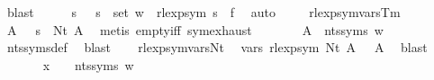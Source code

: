 \begin{isabellebody}
\ blast\isanewline
\ \ \isamarkupfalse%
\ \isamarkupfalse%
\ s\ \ {\isacharasterisk}{\kern0pt}{\isacharasterisk}{\kern0pt}{\isacharcolon}{\kern0pt}\ {\isachardoublequoteopen}s\ {\isasymin}\ set\ w\ {\isasymand}\ rlexp{\isacharunderscore}{\kern0pt}sym\ s\ {\isacharequal}{\kern0pt}\ f{\isachardoublequoteclose}\ \isamarkupfalse%
\ auto\isanewline
\ \ \isamarkupfalse%
\ {\isacharasterisk}{\kern0pt}\ rlexp{\isacharunderscore}{\kern0pt}sym{\isacharunderscore}{\kern0pt}vars{\isacharunderscore}{\kern0pt}Tm\ \isamarkupfalse%
\ A\ \ {\isacharasterisk}{\kern0pt}{\isacharasterisk}{\kern0pt}{\isacharasterisk}{\kern0pt}{\isacharcolon}{\kern0pt}\ {\isachardoublequoteopen}s\ {\isacharequal}{\kern0pt}\ Nt\ A{\isachardoublequoteclose}\ \isamarkupfalse%
\ {\isacharparenleft}{\kern0pt}metis\ empty{\isacharunderscore}{\kern0pt}iff\ sym{\isachardot}{\kern0pt}exhaust{\isacharparenright}{\kern0pt}\isanewline
\ \ \isamarkupfalse%
\ {\isacharasterisk}{\kern0pt}{\isacharasterisk}{\kern0pt}\ \isamarkupfalse%
\ {\isacharasterisk}{\kern0pt}{\isacharasterisk}{\kern0pt}{\isacharasterisk}{\kern0pt}{\isacharasterisk}{\kern0pt}{\isacharcolon}{\kern0pt}\ {\isachardoublequoteopen}A\ {\isasymin}\ nts{\isacharunderscore}{\kern0pt}syms\ w{\isachardoublequoteclose}\ \isamarkupfalse%
\ nts{\isacharunderscore}{\kern0pt}syms{\isacharunderscore}{\kern0pt}def\ \isamarkupfalse%
\ blast\isanewline
\ \ \isamarkupfalse%
\ rlexp{\isacharunderscore}{\kern0pt}sym{\isacharunderscore}{\kern0pt}vars{\isacharunderscore}{\kern0pt}Nt\ \isamarkupfalse%
\ {\isachardoublequoteopen}vars\ {\isacharparenleft}{\kern0pt}rlexp{\isacharunderscore}{\kern0pt}sym\ {\isacharparenleft}{\kern0pt}Nt\ A{\isacharparenright}{\kern0pt}{\isacharparenright}{\kern0pt}\ {\isacharequal}{\kern0pt}\ {\isacharbraceleft}{\kern0pt}{\isasymgamma}{\isacharprime}{\kern0pt}\ A{\isacharbraceright}{\kern0pt}{\isachardoublequoteclose}\ \isamarkupfalse%
\ blast\isanewline
\ \ \isamarkupfalse%
\ {\isacharasterisk}{\kern0pt}\ {\isacharasterisk}{\kern0pt}{\isacharasterisk}{\kern0pt}\ {\isacharasterisk}{\kern0pt}{\isacharasterisk}{\kern0pt}{\isacharasterisk}{\kern0pt}\ {\isacharasterisk}{\kern0pt}{\isacharasterisk}{\kern0pt}{\isacharasterisk}{\kern0pt}{\isacharasterisk}{\kern0pt}\ \isamarkupfalse%
\ {\isachardoublequoteopen}x\ {\isasymin}\ {\isasymgamma}{\isacharprime}{\kern0pt}\ {\isacharbackquote}{\kern0pt}\ nts{\isacharunderscore}{\kern0pt}syms\ w{\isachardoublequoteclose}\ \isamarkupfalse%

\end{isabellebody}
